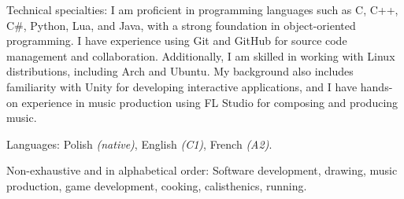 \documentclass[10pt,a4paper]{article} %
\begin{document}
\spacedhrule{0.8em}{-0.4em} %


\inlineheadsection %
{Technical specialties:}
{I am proficient in programming languages such as C, C++, C\#, Python, Lua, and Java, 
with a strong foundation in object-oriented programming. I have experience using Git and 
GitHub for source code management and collaboration. Additionally, I am skilled in working 
with Linux distributions, including Arch and Ubuntu. My background also includes 
familiarity with Unity for developing interactive applications, and I have hands-on 
experience in music production using FL Studio for composing and producing music.}


\inlineheadsection %
{Languages:}
{Polish \textit{(native)}, English \textit{(C1)}, French \textit{(A2)}.}


\spacedhrule{1.6em}{-0.4em} %



\inlineheadsection %
{Non-exhaustive and in alphabetical order:}
{Software development, drawing, music production, game development, cooking, calisthenics, running.}

\end{document}
